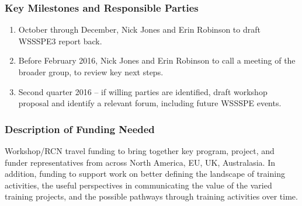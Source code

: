 \subsubsection{Key Milestones and Responsible Parties}
\begin{enumerate}

\item October through December, Nick Jones and Erin Robinson to draft WSSSPE3 report back.

\item Before February 2016, Nick Jones and Erin Robinson to call a meeting of
the broader group, to review key next steps.
    
\item Second quarter 2016 -- if willing parties are identified, draft workshop proposal
and identify a relevant forum, including future WSSSPE events.
    
\end{enumerate}

\subsubsection{Description of Funding Needed}

Workshop/RCN travel funding to bring together key program, project, and funder
representatives from across North America, EU, UK, Australasia. In addition,
funding to support work on better defining the landscape of training activities,
the useful perspectives in communicating the value of the varied training
projects, and the possible pathways through training activities over time.
